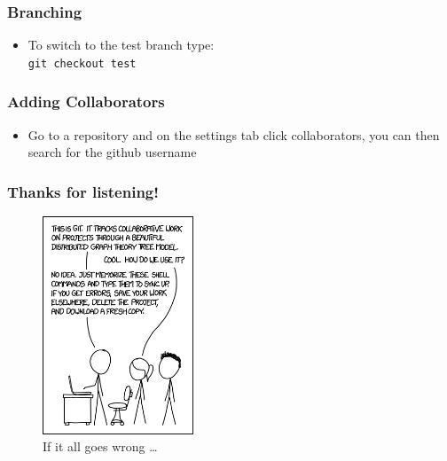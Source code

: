 \documentclass{beamer}
\begin{document}
\begin{frame}
\frametitle{Branching}
\begin{itemize}
	\item To switch to the test branch type: \\ 
	\texttt{git checkout test} \\
\end{itemize}
\end{frame}

\begin{frame}
\frametitle{Adding Collaborators}
\begin{itemize}
	\item Go to a repository and on the settings tab click collaborators, you can then search for the github username
\end{itemize}
\end{frame}


\begin{frame}
\frametitle{Thanks for listening!}
\begin{figure}[H]
	\centering
	\includegraphics[width=0.4\textwidth]{xkcdgit.png}
	\caption{If it all goes wrong \ldots \footnotemark }
	\label{fig:xkcdversion}
\end{figure}
\end{frame}
\end{document}
